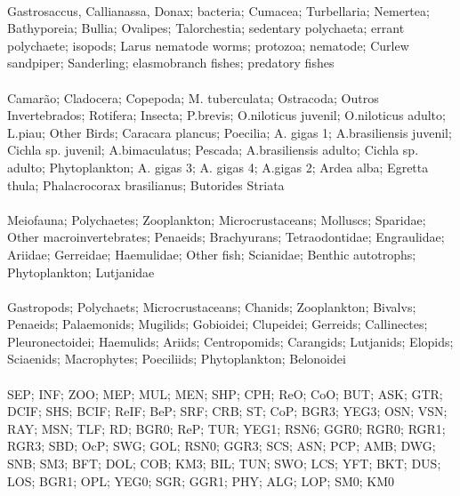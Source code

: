 \hline
{} \\
\hline
Gastrosaccus, Callianassa, Donax; bacteria; Cumacea; Turbellaria; Nemertea; Bathyporeia; Bullia; Ovalipes; Talorchestia; sedentary polychaeta; errant polychaete; isopods; Larus nematode worms; protozoa; nematode; Curlew sandpiper; Sanderling; elasmobranch fishes; predatory fishes\\
\fullhline
\hline
{} \\
\hline
Camarão; Cladocera; Copepoda; M. tuberculata; Ostracoda; Outros Invertebrados; Rotifera; Insecta; P.brevis; O.niloticus juvenil; O.niloticus adulto; L.piau; Other Birds; Caracara plancus; Poecilia; A. gigas 1; A.brasiliensis juvenil; Cichla sp. juvenil; A.bimaculatus; Pescada; A.brasiliensis adulto; Cichla sp. adulto; Phytoplankton; A. gigas 3; A. gigas 4; A.gigas 2; Ardea alba; Egretta thula; Phalacrocorax brasilianus; Butorides Striata\\
\fullhline
\hline
{} \\
\hline
Meiofauna; Polychaetes; Zooplankton; Microcrustaceans; Molluscs; Sparidae; Other macroinvertebrates; Penaeids; Brachyurans; Tetraodontidae; Engraulidae; Ariidae; Gerreidae; Haemulidae; Other fish; Scianidae; Benthic autotrophs; Phytoplankton; Lutjanidae\\
\fullhline
\hline
{} \\
\hline
Gastropods; Polychaets; Microcrustaceans; Chanids; Zooplankton; Bivalvs; Penaeids; Palaemonids; Mugilids; Gobioidei; Clupeidei; Gerreids; Callinectes; Pleuronectoidei; Haemulids; Ariids; Centropomids; Carangids; Lutjanids; Elopids; Sciaenids; Macrophytes; Poeciliids; Phytoplankton; Belonoidei\\
\fullhline
\hline
{} \\
\hline
SEP; INF; ZOO; MEP; MUL; MEN; SHP; CPH; ReO; CoO; BUT; ASK; GTR; DCIF; SHS; BCIF; ReIF; BeP; SRF; CRB; ST; CoP; BGR3; YEG3; OSN; VSN; RAY; MSN; TLF; RD; BGR0; ReP; TUR; YEG1; RSN6; GGR0; RGR0; RGR1; RGR3; SBD; OcP; SWG; GOL; RSN0; GGR3; SCS; ASN; PCP; AMB; DWG; SNB; SM3; BFT; DOL; COB; KM3; BIL; TUN; SWO; LCS; YFT; BKT; DUS; LOS; BGR1; OPL; YEG0; SGR; GGR1; PHY; ALG; LOP; SM0; KM0\\
\fullhline
\hline
{} \\

